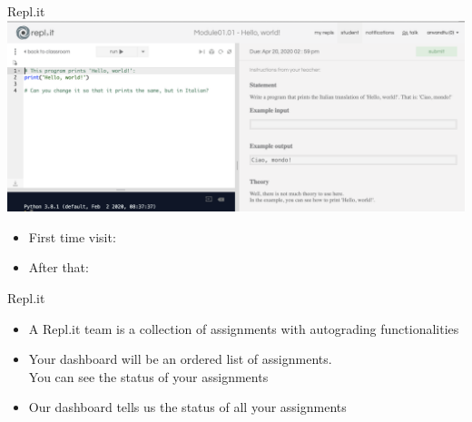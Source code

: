 \documentclass{beamer}%
\begin{document}

\begin{frame}{Repl.it}
\centering 
 \includegraphics[width=1.0\textwidth]{figures/replNew}
\begin{itemize}
\item First time visit:
\myurl{\replstudentsinvitation}
\item After that: \hspace{0.58cm} \myurl{\replstudents}
\end{itemize}
\end{frame}

\begin{frame}{Repl.it}
\centering 
\begin{itemize}
\item A Repl.it team is a collection of assignments with autograding functionalities
\item Your dashboard will be an ordered list of assignments. \\ You can see the status of your assignments
\item Our dashboard tells us the status of all your assignments
\end{itemize}
\end{frame}
\end{document}
